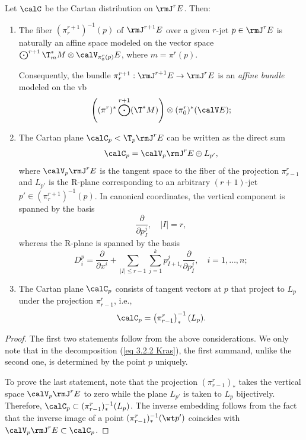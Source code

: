 \begin{thm}\label{thm 3.2.1 Kras}
    Let $\calC$ be the Cartan distribution on $\rmJ^rE$. Then:
    \begin{enumerate}
        \item The fiber $(\pi^{r+1}_{r})^{-1}(p)$ of $\rmJ^{r+1}E$ over a given $r$-jet $p\in \rmJ^rE$ is naturally an affine space modeled on the vector space $\bigodot^{r+1}\T^\ast_m M\otimes \calV_{\pi^r_0(p)}E$, where $m=\pi^r(p)$. 
        
        Consequently, the bundle $\pi^{r+1}_r:\rmJ^{r+1}E\to \rmJ^rE$ is an \emph{affine bundle} modeled on the \gls{vb} 
        \[\left((\pi^r)^\ast \bigodot^{r+1}(\T^\ast M)\right)\otimes (\pi^r_0)^\ast (\calV E);\]        
        \item The Cartan plane $\calC_p<\T_p \rmJ^rE$ can be written as the direct sum
        \[\calC_p=\calV_p\rmJ^rE\oplus L_{p'},\label{eq 3.2.2 Kras}\]
        where $\calV_p\rmJ^rE$ is the tangent space to the fiber of the projection $\pi^r_{r-1}$ and $L_{p'}$ is the R-plane corresponding to an arbitrary $(r+1)$-jet $p'\in(\pi^{r+1}_r)^{-1}(p)$. In canonical coordinates, the vertical component is spanned by the basis
        \[\frac{\partial}{\partial p^j_{I}}, \quad |I|=r,\] 
        whereas the R-plane is spanned by the basis
        \[D^p_i=\frac{\partial}{\partial x^i}+\sum_{|I|\leq r-1}\sum_{j=1}^k p^j_{I+1_i}\frac{\partial}{\partial p^j_I},\quad i=1,\ldots,n;\]
        \item The Cartan plane $\calC_p$ consists of tangent vectors at $p$ that project to $L_p$ under the projection $\pi^r_{r-1}$, i.e.,
        \[\calC_p=\left(\pi^r_{r-1}\right)_\ast^{-1}(L_p).\]
    \end{enumerate}
\end{thm}
\begin{proof}
    The first two statements follow from the above considerations. We only note that in the decomposition (\ref{eq 3.2.2 Kras}), the first summand, unlike the second one, is determined by the point $p$ uniquely.

    To prove the last statement, note that the projection $(\pi^r_{r-1})_\ast$ takes the vertical space $\calV_p\rmJ^rE$ to zero while the plane $L_{p'}$ is taken to $L_p$ bijectively. Therefore, $\calC_p\subset (\pi^r_{r-1})^{-1}_\ast(L_p)$. The inverse embedding follows from the fact that the inverse image of a point $(\pi^r_{r-1})^{-1}_\ast(\wt p')$ coincides with $\calV_p\rmJ^rE\subset\calC_p$.
\end{proof}


